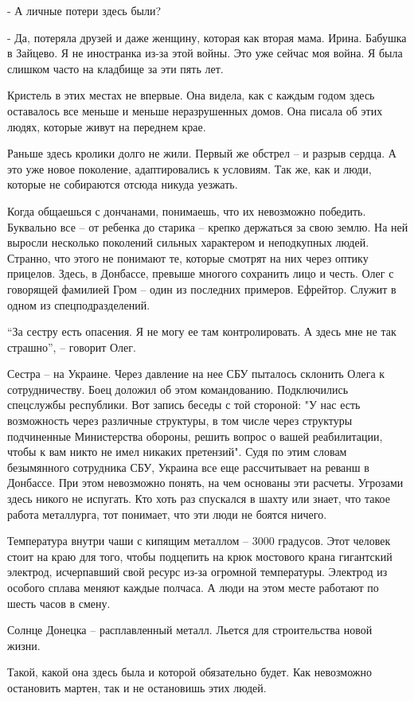 - А личные потери здесь были?

- Да, потеряла друзей и даже женщину, которая как вторая мама. Ирина. Бабушка в
Зайцево. Я не иностранка из-за этой войны. Это уже сейчас моя война. Я была
слишком часто на кладбище за эти пять лет.

Кристель в этих местах не впервые. Она видела, как с каждым годом здесь
оставалось все меньше и меньше неразрушенных домов. Она писала об этих людях,
которые живут на переднем крае.

Раньше здесь кролики долго не жили. Первый же обстрел – и разрыв сердца. А это
уже новое поколение, адаптировались к условиям. Так же, как и люди, которые не
собираются отсюда никуда уезжать.

Когда общаешься с дончанами, понимаешь, что их невозможно победить. Буквально
все – от ребенка до старика – крепко держаться за свою землю. На ней выросли
несколько поколений сильных характером и неподкупных людей. Странно, что этого
не понимают те, которые смотрят на них через оптику прицелов. Здесь, в
Донбассе, превыше многого сохранить лицо и честь. Олег с говорящей фамилией
Гром – один из последних примеров. Ефрейтор. Служит в одном из
спецподразделений.

\enquote{За сестру есть опасения. Я не могу ее там контролировать. А здесь мне не так
страшно}, – говорит Олег.

Сестра – на Украине. Через давление на нее СБУ пыталось склонить Олега к
сотрудничеству. Боец доложил об этом командованию. Подключились спецслужбы
республики. Вот запись беседы с той стороной: "У нас есть возможность через
различные структуры, в том числе через структуры подчиненные Министерства
обороны, решить вопрос о вашей реабилитации, чтобы к вам никто не имел никаких
претензий". Судя по этим словам безымянного сотрудника СБУ, Украина все еще
рассчитывает на реванш в Донбассе. При этом невозможно понять, на чем основаны
эти расчеты. Угрозами здесь никого не испугать. Кто хоть раз спускался в шахту
или знает, что такое работа металлурга, тот понимает, что эти люди не боятся
ничего.

Температура внутри чаши с кипящим металлом – 3000 градусов. Этот человек стоит
на краю для того, чтобы подцепить на крюк мостового крана гигантский электрод,
исчерпавший свой ресурс из-за огромной температуры. Электрод из особого сплава
меняют каждые полчаса. А люди на этом месте работают по шесть часов в смену.

Солнце Донецка – расплавленный металл. Льется для строительства новой жизни.

Такой, какой она здесь была и которой обязательно будет. Как невозможно
остановить мартен, так и не остановишь этих людей.
